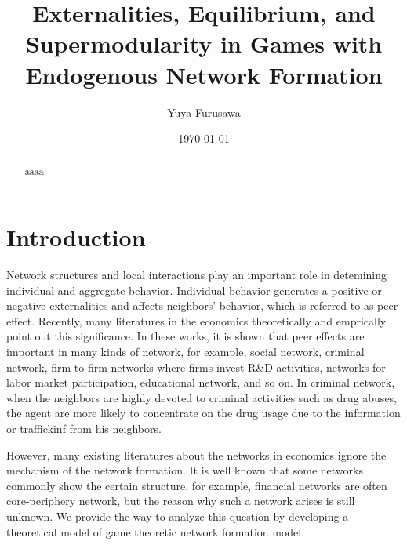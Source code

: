 \documentclass[12pt]{article}
\theoremstyle{definition}
\begin{document}
\title{Externalities, Equilibrium, and Supermodularity in Games with Endogenous Network Formation}

\author{Yuya Furusawa}

\date{\today}

\maketitle

\begin{abstract}
aaaa
\end{abstract}


\section{Introduction}

Network structures and local interactions play an important role in detemining individual and aggregate behavior.
Individual behavior generates a positive or negative externalities and affects neighbors' behavior, which is referred to as peer effect.
Recently, many literatures in the economics theoretically and emprically point out this significance.
In these works, it is shown that peer effects are important in many kinds of network, for example, social network, criminal network, firm-to-firm networks where firms invest R\&D activities, networks for labor market participation, educational network, and so on.
In criminal network, when the neighbors are highly devoted to criminal activities such as drug abuses, the agent are more likely to concentrate on the drug usage due to the information or traffickinf from his neighbors.

However, many existing literatures about the networks in economics ignore the mechanism of the network formation.
It is well known that some networks commonly show the certain structure, for example, financial networks are often core-periphery network, but the reason why such a network arises is still unknown.
We provide the way to analyze this question by developing a theoretical model of game theoretic network formation model.
\end{document}
